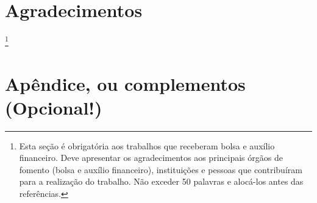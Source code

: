 \documentclass{modelo}
\newcommand{\agradecimentosTexto}{Esta seção é obrigatória aos trabalhos que receberam bolsa e auxílio financeiro. Deve apresentar os agradecimentos aos principais órgãos de fomento (bolsa e auxílio financeiro), instituições e pessoas que contribuíram para a realização do trabalho. Não exceder 50 palavras e alocá-los antes das referências.}
\begin{document}
\section*{Agradecimentos}
\thanks{\agradecimentosTexto}  

 


\appendix
\section*{Apêndice, ou complementos (Opcional!)}\label{apendiceA}
\end{document}
